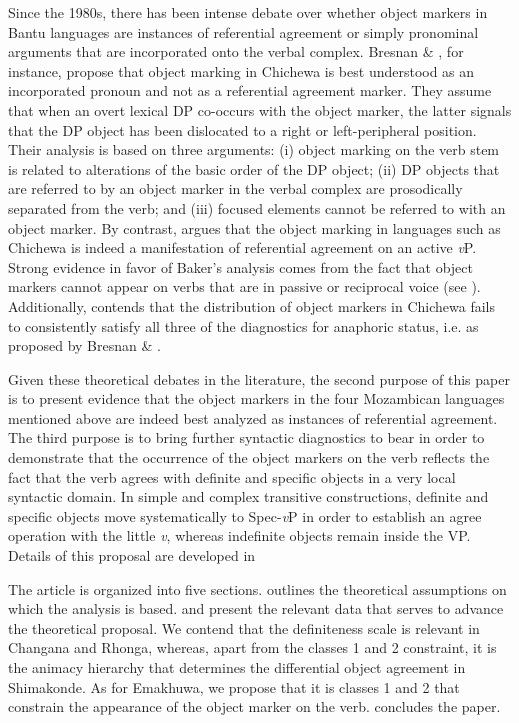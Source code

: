\documentclass[output=paper]{langsci/langscibook}
\begin{document}
Since the 1980s, there has been intense debate over whether object markers in Bantu languages are instances of referential agreement or simply pronominal arguments that are incorporated onto the verbal complex. Bresnan \& \citet{Mchombo1987}, for instance, propose that object marking in Chichewa is best understood as an incorporated pronoun and not as a referential agreement marker. They assume that when an overt lexical DP co-occurs with the object marker, the latter signals that the DP object has been dislocated to a right or left-peripheral position. Their analysis is based on three arguments: (i) object marking on the verb stem is related to alterations of the basic order of the DP object; (ii) DP objects that are referred to by an object marker in the verbal complex are prosodically separated from the verb; and (iii) focused elements cannot be referred to with an object marker. By contrast, \citet{Baker2008} argues that the object marking in languages such as Chichewa is indeed a manifestation of referential agreement on an active {\textit{v}}P. Strong evidence in favor of Baker’s analysis comes from the fact that object markers cannot appear on verbs that are in passive or reciprocal voice (see ). Additionally, \citet{Downing2014} contends that the distribution of object markers in Chichewa fails to consistently satisfy all three of the diagnostics for anaphoric status, i.e. as proposed by Bresnan \& \citet{Mchombo1987}.

Given these theoretical debates in the literature, the second purpose of this paper is to present evidence that the object markers in the four Mozambican languages mentioned above are indeed best analyzed as instances of referential agreement. The third purpose is to bring further syntactic diagnostics to bear in order to demonstrate that the occurrence of the object markers on the verb reflects the fact that the verb agrees with definite and specific objects in a very local syntactic domain. In simple and complex transitive constructions, definite and specific objects move systematically to Spec-\textit{v}P in order to establish an agree operation with the little {\textit{v}}, whereas indefinite objects remain inside the VP. Details of this proposal are developed in 

The article is organized into five sections.  outlines the theoretical assumptions on which the analysis is based.  and  present the relevant data that serves to advance the theoretical proposal. We contend that the definiteness scale is relevant in Changana and Rhonga, whereas, apart from the classes 1 and 2 constraint, it is the animacy hierarchy that determines the differential object agreement in Shimakonde. As for Emakhuwa, we propose that it is classes 1 and 2 that constrain the appearance of the object marker on the verb.  concludes the paper.
\end{document}
